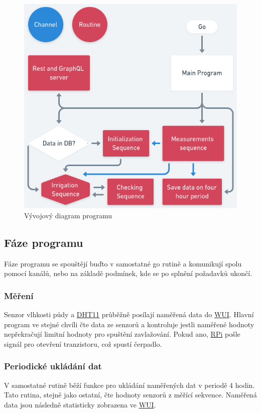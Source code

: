 \documentclass[czech,12pt,a4paper]{article}
\begin{document}
\begin{figure}[h]
	\centering
	\includegraphics[width=0.72\linewidth]{go.png}
	\caption{Vývojový diagram programu}
\end{figure}

\subsection{Fáze programu}

Fáze programu se spouštějí buďto v samostatné go rutině a komunikují spolu pomocí kanálů, nebo na základě podmínek, kde se po splnění požadavků ukončí.

\subsubsection{Měření}

Senzor vlhkosti půdy a \underline{\ac{DHT11}} průběžně posílají naměřená data do \underline{\ac{WUI}}. Hlavní program ve stejné chvíli čte data ze senzorů a kontroluje jestli naměřené hodnoty nepřekračují limitní hodnoty pro spuštění zavlažování. Pokud ano, \underline{\ac{RPi}} pošle signál pro otevření tranzistoru, což spustí čerpadlo.

\subsubsection{Periodické ukládání dat}

V samostatné rutině běží funkce pro ukládání naměřených dat v periodě 4 hodin. Tato rutina, stejně jako ostatní, čte hodnoty senzorů z měřící sekvence. Naměřená data jsou následně statisticky zobrazena ve \underline{\ac{WUI}}.
\end{document}
